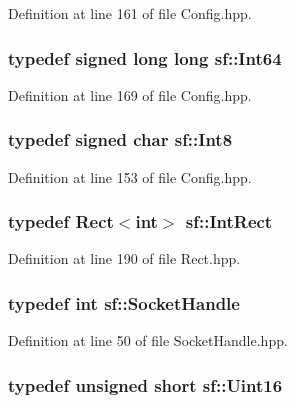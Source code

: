 Definition at line 161 of file Config.\-hpp.

\hypertarget{namespacesf_a2840579fed3494d9f330baf7a5a19903}{
\subsubsection[{Int64}]{\setlength{\rightskip}{0pt plus 5cm}typedef signed long long {\bf sf\-::\-Int64}}}\label{namespacesf_a2840579fed3494d9f330baf7a5a19903}


Definition at line 169 of file Config.\-hpp.

\hypertarget{namespacesf_a69b109973eac74e22b97e5339bdb68dd}{
\subsubsection[{Int8}]{\setlength{\rightskip}{0pt plus 5cm}typedef signed char {\bf sf\-::\-Int8}}}\label{namespacesf_a69b109973eac74e22b97e5339bdb68dd}


Definition at line 153 of file Config.\-hpp.

\hypertarget{namespacesf_aae67411782674934f78d55fa3af18403}{
\subsubsection[{Int\-Rect}]{\setlength{\rightskip}{0pt plus 5cm}typedef {\bf Rect}$<$int$>$ {\bf sf\-::\-Int\-Rect}}}\label{namespacesf_aae67411782674934f78d55fa3af18403}


Definition at line 190 of file Rect.\-hpp.

\hypertarget{namespacesf_aefabb521d8f5eec9e6a9b521271d20d1}{
\subsubsection[{Socket\-Handle}]{\setlength{\rightskip}{0pt plus 5cm}typedef int {\bf sf\-::\-Socket\-Handle}}}\label{namespacesf_aefabb521d8f5eec9e6a9b521271d20d1}


Definition at line 50 of file Socket\-Handle.\-hpp.

\hypertarget{namespacesf_a2fcaf787248b0b83dfb6b145ca348246}{
\subsubsection[{Uint16}]{\setlength{\rightskip}{0pt plus 5cm}typedef unsigned short {\bf sf\-::\-Uint16}}}\label{namespacesf_a2fcaf787248b0b83dfb6b145ca348246}


